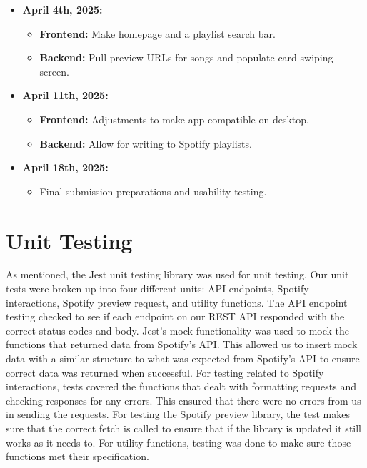 \documentclass{article}
\begin{document}
\begin{itemize}
    \item \textbf{April 4th, 2025:}
        \begin{itemize}
            \item \textbf{Frontend:} Make homepage and a playlist search bar.
            \item \textbf{Backend:} Pull preview URLs for songs and populate card swiping screen.
        \end{itemize}
    \item \textbf{April 11th, 2025:}
        \begin{itemize}
            \item \textbf{Frontend:} Adjustments to make app compatible on desktop.
            \item \textbf{Backend:} Allow for writing to Spotify playlists. 
        \end{itemize}
    \item \textbf{April 18th, 2025:}
        \begin{itemize}
            \item Final submission preparations and usability testing.
        \end{itemize}
\end{itemize}

\section{Unit Testing}
\quad \quad As mentioned, the Jest unit testing library was used for unit testing. Our unit tests were broken up into four different units: API endpoints, Spotify interactions, Spotify preview request, and utility functions. The API endpoint testing checked to see if each endpoint on our REST API responded with the correct status codes and body. Jest's mock functionality was used to mock the functions that returned data from Spotify's API. This allowed us to insert mock data with a similar structure to what was expected from Spotify's API to ensure correct data was returned when successful. For testing related to Spotify interactions, tests covered the functions that dealt with formatting requests and checking responses for any errors. This ensured that there were no errors from us in sending the requests. For testing the Spotify preview library, the test makes sure that the correct fetch is called to ensure that if the library is updated it still works as it needs to. For utility functions, testing was done to make sure those functions met their specification.
\end{document}
